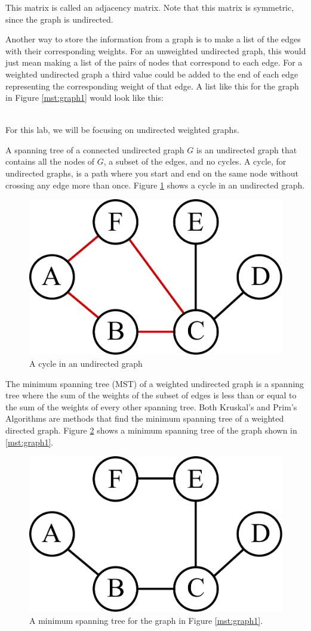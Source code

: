 This matrix is called an adjacency matrix.
Note that this matrix is symmetric, since the graph is undirected. 

Another way to store the information from a graph is to make a list of the edges with their corresponding weights.
For an unweighted undirected graph, this would just mean making a list of the pairs of nodes that correspond to each edge.
For a weighted undirected graph a third value could be added to the end of each edge representing the corresponding weight of that edge.
A list like this for the graph in Figure \ref{mst:graph1} would look like this:

\begin{align*}
[('A', 'B'),
 ('B', 'C'),
 ('B', 'E'),
 ('B', 'F'),
 ('C', 'D'),\\
 ('C', 'E'),
 ('C', 'F'),
 ('D', 'E'),
 ('E', 'F')]
\end{align*}

For this lab, we will be focusing on undirected weighted graphs.

A spanning tree of a connected undirected graph $G$ is an undirected graph that contains all the nodes of $G$, a subset of the edges, and no cycles.
A cycle, for undirected graphs, is a path where you start and end on the same node without crossing any edge more than once.
Figure \ref{mst:graph3} shows a cycle in an undirected graph.

\begin{figure}[H]
\includegraphics[width = .4\textwidth]{graph3.pdf}
\caption{A cycle in an undirected graph}
\label{mst:graph3}
\end{figure}

The minimum spanning tree (MST) of a weighted undirected graph is a spanning tree where the sum of the weights of the subset of edges is less than or equal to the sum of the weights of every other spanning tree.
Both Kruskal's and Prim's Algorithms are methods that find the minimum spanning tree of a weighted directed graph.
Figure \ref{mst:graph2} shows a minimum spanning tree of the graph shown in \ref{mst:graph1}.

\begin{figure}[H]
\includegraphics[width = .4\textwidth]{graph2.pdf}
\caption{A minimum spanning tree for the graph in Figure \ref{mst:graph1}.}
\label{mst:graph2}
\end{figure}

